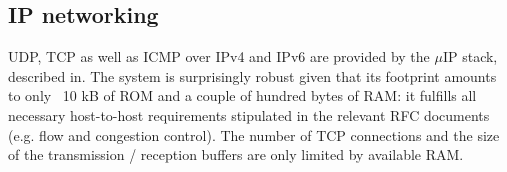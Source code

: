 \documentclass[final,a4paper,twoside,11pt,onecolumn]{report}
\begin{document}




\subsection{IP networking}
UDP, TCP as well as ICMP over IPv4 and IPv6 are provided by the $\mu$IP stack, described in\cite{dunkels2003full}. The system is surprisingly robust given that its footprint amounts to only ~10 kB of ROM and a couple of hundred bytes of RAM: it fulfills all necessary host-to-host requirements stipulated in the relevant RFC documents\citep[p.4]{dunkels2003full} (e.g. flow and congestion control). The number of TCP connections and the size of the transmission / reception buffers are only limited by available RAM.
\end{document}

